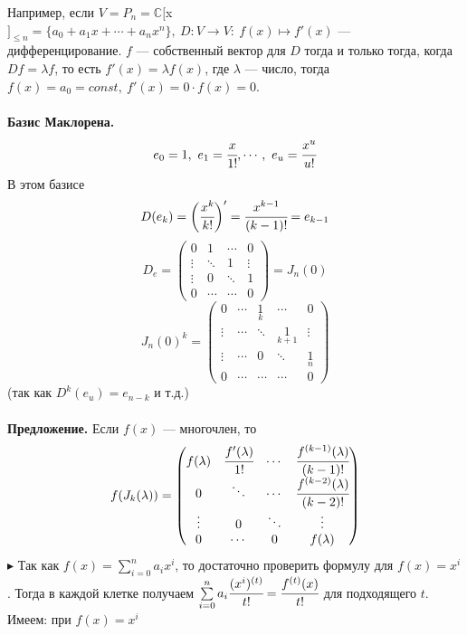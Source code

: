 \documentclass[12pt]{article}
\theoremstyle{definition}
\numberwithin{equation}{section}
\begin{document}
Например, если $V=P_n=\mathbb{C}[$x$]_{\leqslant n}=\{a_0+a_1x+\cdots +a_nx^n\},~D:V\to V:~f(x) \mapsto f'(x)$ --- дифференцирование. $f$ --- собственный вектор для $D$ тогда и только тогда, когда $Df=\lambda f$, то есть $f'(x)=\lambda f(x)$, где $\lambda$ --- число, тогда $f(x)=a_0=const,~f'(x)=0\cdot f(x)=0$.\\
\\
\textbf{Базис Маклорена.}\\
$$e_0=1,~e_1=\cfrac{x}{1!},\cdots,~e_u=\cfrac{x^u}{u!}$$
В этом базисе
$$D(e_k)=\bigg(\cfrac{x^k}{k!}\bigg)'=\cfrac{x^{k-1}}{(k-1)!}=e_{k-1}$$
\[D_e = \begin{pmatrix}
0 &  1 & \cdots & 0\\
\vdots & \ddots & 1 & \vdots\\
\vdots & 0 & \ddots & 1\\
0 & \cdots & \cdots & 0
\end{pmatrix} = J_n(0)\]
\[J_n(0)^k = \begin{pmatrix}
0 &  \cdots & \underset{k}{1} & \cdots & 0\\
\vdots & \cdots & \ddots & \underset{k+1}{1} & \vdots\\
\vdots & \cdots & 0 & \ddots & \underset{n}{1}\\
0 & \cdots & \cdots & \cdots & 0
\end{pmatrix}\]
(так как $D^k(e_u)=e_{n-k}$ и т.д.)\\
\\
\textbf{Предложение.} Если $f(x)$ --- многочлен, то
\[f(J_k(\lambda)) = \begin{pmatrix}
f(\lambda) & \cfrac{f'(\lambda)}{1!} & \cdots & \cfrac{f^{(k-1)}(\lambda)}{(k-1)!}\\
0 & \ddots & \cdots & \cfrac{f^{(k-2)}(\lambda)}{(k-2)!}\\
\vdots & 0 & \ddots & \vdots\\
0 & \cdots & 0 & f(\lambda)\\
\end{pmatrix}\]
$\blacktriangleright$ Так как $f(x)=\sum\limits_{i=0}^n a_ix^i$, то достаточно проверить формулу для $f(x)=x^i$. Тогда в каждой клетке получаем $\sum\limits_{i=0}^n a_i\cfrac{(x^i)^{(t)}}{t!}=\cfrac{f^{(t)}(x)}{t!}$ для подходящего $t$. \\
Имеем: при $f(x)=x^i$
\end{document}
